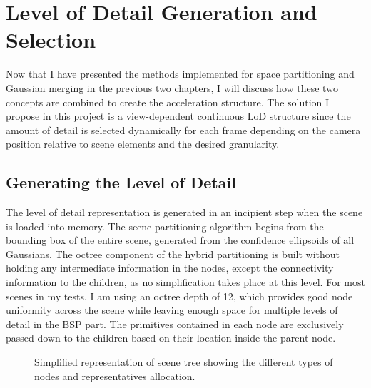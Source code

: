 \section{Level of Detail Generation and Selection}
Now that I have presented the methods implemented for space partitioning and Gaussian merging in the previous two chapters, I will discuss how these two concepts are combined to create the acceleration structure. The solution I propose in this project is a view-dependent continuous LoD structure \cite{lod} since the amount of detail is selected dynamically for each frame depending on the camera position relative to scene elements and the desired granularity.

\subsection{Generating the Level of Detail}
The level of detail representation is generated in an incipient step when the scene is loaded into memory. The scene partitioning algorithm begins from the bounding box of the entire scene, generated from the confidence ellipsoids of all Gaussians. The octree component of the hybrid partitioning is built without holding any intermediate information in the nodes, except the connectivity information to the children, as no simplification takes place at this level. For most scenes in my tests, I am using an octree depth of 12, which provides good node uniformity across the scene while leaving enough space for multiple levels of detail in the BSP part. The primitives contained in each node are exclusively passed down to the children based on their location inside the parent node.

\begin{figure}[H]
    \centering
    \makebox[\textwidth][c]{}
    \caption{Simplified representation of scene tree showing the different types of nodes and representatives allocation.}
    \label{fig:scenetree}
\end{figure}

